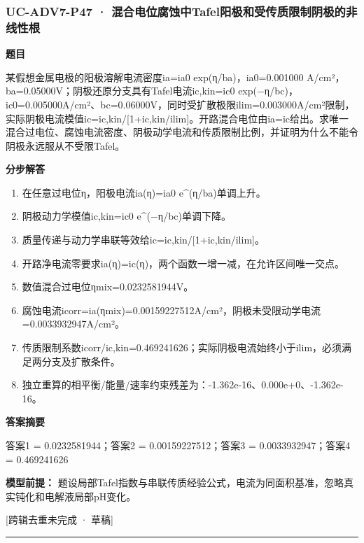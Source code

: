 \documentclass[UTF8,11pt,a4paper]{ctexart}
\begin{document}
\subsubsection*{UC-ADV7-P47 · 混合电位腐蚀中Tafel阳极和受传质限制阴极的非线性根}
\noindent\textbf{题目}\par
某假想金属电极的阳极溶解电流密度ia=ia0 exp(η/ba)，ia0=0.001000 A/cm²，ba=0.05000V；阴极还原分支具有Tafel电流ic,kin=ic0 exp(−η/bc)，ic0=0.005000A/cm²、bc=0.06000V，同时受扩散极限ilim=0.003000A/cm²限制，实际阴极电流模值ic=ic,kin/[1+ic,kin/ilim]。开路混合电位由ia=ic给出。求唯一混合过电位、腐蚀电流密度、阴极动学电流和传质限制比例，并证明为什么不能令阴极永远服从不受限Tafel。\par
\medskip\noindent\textbf{分步解答}
\begin{enumerate}
\item 在任意过电位η，阳极电流ia(η)=ia0 e\textasciicircum{}(η/ba)单调上升。
\item 阴极动力学模值ic,kin=ic0 e\textasciicircum{}(−η/bc)单调下降。
\item 质量传递与动力学串联等效给ic=ic,kin/[1+ic,kin/ilim]。
\item 开路净电流零要求ia(η)=ic(η)，两个函数一增一减，在允许区间唯一交点。
\item 数值混合过电位ηmix=0.0232581944V。
\item 腐蚀电流icorr=ia(ηmix)=0.00159227512A/cm²，阴极未受限动学电流=0.0033932947A/cm²。
\item 传质限制系数icorr/ic,kin=0.469241626；实际阴极电流始终小于ilim，必须满足两分支及扩散条件。
\item 独立重算的相平衡/能量/速率约束残差为：-1.362e-16、0.000e+0、-1.362e-16。
\end{enumerate}
\noindent\textbf{答案摘要}\par
答案1 = 0.0232581944；答案2 = 0.00159227512；答案3 = 0.0033932947；答案4 = 0.469241626\par
\noindent\textbf{模型前提：}
题设局部Tafel指数与串联传质经验公式，电流为同面积基准，忽略真实钝化和电解液局部pH变化。\par
\noindent\textcolor{red!65!black}{[跨辑去重未完成 · 草稿]} \par
\medskip\hrule\medskip
{}
\end{document}

